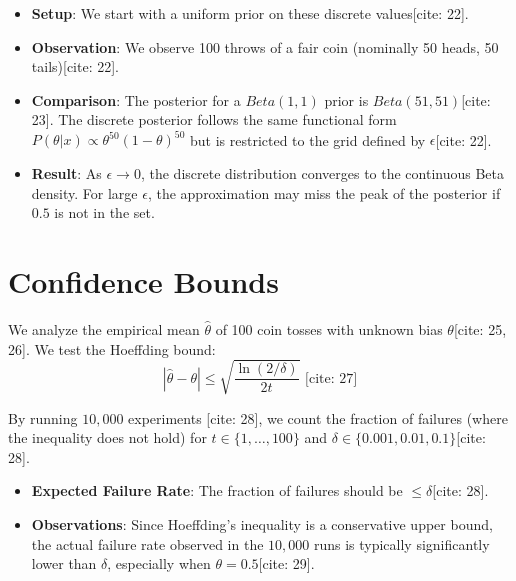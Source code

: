 \documentclass[11pt]{article}
\begin{document}
\begin{itemize}
    \item \textbf{Setup}: We start with a uniform prior on these discrete values[cite: 22].
    \item \textbf{Observation}: We observe 100 throws of a fair coin (nominally 50 heads, 50 tails)[cite: 22].
    \item \textbf{Comparison}: The posterior for a $Beta(1,1)$ prior is $Beta(51, 51)$[cite: 23]. The discrete posterior follows the same functional form $P(\theta | x) \propto \theta^{50}(1-\theta)^{50}$ but is restricted to the grid defined by $\epsilon$[cite: 22]. 
    \item \textbf{Result}: As $\epsilon \to 0$, the discrete distribution converges to the continuous Beta density. For large $\epsilon$, the approximation may miss the peak of the posterior if $0.5$ is not in the set.
\end{itemize}

\section{Confidence Bounds}

We analyze the empirical mean $\hat{\theta}$ of 100 coin tosses with unknown bias $\theta$[cite: 25, 26]. We test the Hoeffding bound:
\begin{equation}
    |\hat{\theta} - \theta| \le \sqrt{\frac{\ln(2/\delta)}{2t}} \text{ [cite: 27]}
\end{equation}

By running $10,000$ experiments [cite: 28], we count the fraction of failures (where the inequality does not hold) for $t \in \{1, \dots, 100\}$ and $\delta \in \{0.001, 0.01, 0.1\}$[cite: 28].

\begin{itemize}
    \item \textbf{Expected Failure Rate}: The fraction of failures should be $\le \delta$[cite: 28].
    \item \textbf{Observations}: Since Hoeffding's inequality is a conservative upper bound, the actual failure rate observed in the $10,000$ runs is typically significantly lower than $\delta$, especially when $\theta = 0.5$[cite: 29].
\end{itemize}
\end{document}
